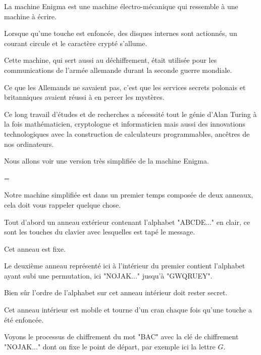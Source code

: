 La machine Enigma est une machine électro-mécanique qui ressemble à une machine à écrire.

\change

Lorsque qu'une touche est enfoncée, des disques internes sont actionnés, un courant circule et le caractère crypté s'allume.

\change

Cette machine, qui sert aussi au déchiffrement, était utilisée pour les communications de l'armée 
allemande durant la seconde guerre mondiale. 

\change

Ce que les 
Allemands ne savaient pas, c'est que les services secrets polonais et britanniques avaient réussi à en percer les mystères.

\change

Ce long travail d'études et de recherches a nécessité tout le génie 
d'Alan Turing à la fois mathématicien, cryptologue et informaticien 
mais aussi des innovations technologiques avec la construction de calculateurs programmables, 
ancêtres de nos ordinateurs.

\diapo

Nous allons voir une version très simplifiée de la machine Enigma. 

=

Notre machine simplifiée est dans un premier temps composée de deux anneaux, cela doit vous rappeler quelque chose.


\change

Tout d'abord un anneau extérieur contenant l'alphabet "ABCDE..." en clair, 
ce sont les touches du clavier avec lesquelles est tapé le message.

Cet anneau est fixe.
  
\change

Le deuxième anneau représenté ici à l'intérieur du premier contient 
l'alphabet ayant subi une permutation, 
ici "NOJAK..." jusqu'à "GWQRUEY". 

\change

Bien sûr l'ordre de l’alphabet sur cet anneau intérieur doit rester secret.

\change

Cet anneau intérieur est mobile et tourne d'un cran chaque fois qu'une touche a été enfoncée. 

\diapo
Voyons le processus de chiffrement du mot "BAC" avec la clé de chiffrement 
"NOJAK..." dont on fixe le point de départ, par exemple ici la lettre $G$.

